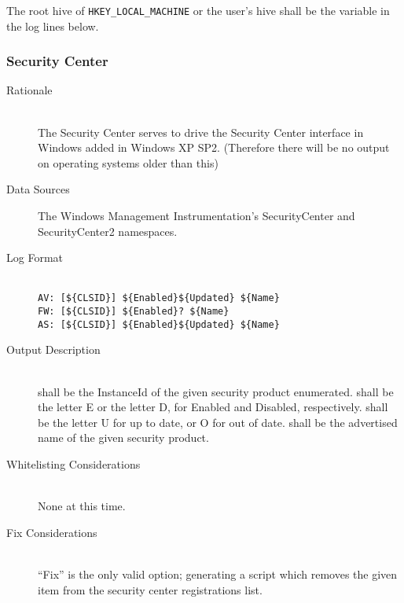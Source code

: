 The root hive of \verb|HKEY_LOCAL_MACHINE| or the user's hive shall be
the variable  in the log lines below.

\subsubsection{Security Center}
\begin{description}
\item[Rationale] \hfill \\
The Security Center serves to drive the Security Center interface in Windows
added in Windows XP SP2. (Therefore there will be no output on operating
systems older than this)
\item[Data Sources] \hfill
The Windows Management Instrumentation's SecurityCenter and SecurityCenter2
namespaces.
\item[Log Format] \hfill \\
\verb|AV: [${CLSID}] ${Enabled}${Updated} ${Name}| \\
\verb|FW: [${CLSID}] ${Enabled}? ${Name}| \\
\verb|AS: [${CLSID}] ${Enabled}${Updated} ${Name}|
\item[Output Description] \hfill \\
 shall be the InstanceId of the given security product enumerated.
 shall be the letter E or the letter D, for Enabled and Disabled,
respectively.  shall be the letter U for up to date, or O for out
of date.  shall be the advertised name of the given security product.
\item[Whitelisting Considerations] \hfill \\
None at this time.
\item[Fix Considerations] \hfill \\
``Fix'' is the only valid option; generating a script which removes the given
item from the security center registrations list.
\end{description}

